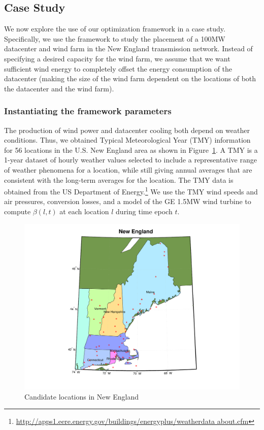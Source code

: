\subsection{Case Study}
\label{sec:eval}

We now explore the use of our optimization framework in a case
study.  Specifically, we use the framework to study the placement of a 100MW
datacenter and wind farm in the New England transmission network.
Instead of specifying a desired capacity for the wind farm, we assume
that we want sufficient wind energy to completely offset the energy
consumption of the datacenter (making the size of the wind farm
dependent on the locations of both the datacenter and the wind farm).

\subsubsection{Instantiating the framework parameters}

The production of wind power and datacenter cooling both depend on
weather conditions.  Thus, we obtained Typical Meteorological Year
(TMY) information for 56 locations in the U.S. New England area as
shown in Figure~\ref{fig:NE_locs}.  A TMY is a 1-year dataset of
hourly weather values selected to include a representative range of
weather phenomena for a location, while still giving annual averages
that are consistent with the long-term averages for the location.  The
TMY data is obtained from the US Department of
Energy.\footnote{\url{http://apps1.eere.energy.gov/buildings/energyplus/weatherdata
    about.cfm}} We use the TMY wind speeds and air pressures,
conversion losses, and a model of the GE 1.5MW wind
turbine \cite{lei2006modeling} to compute
$\beta(l,t)$ at each location $l$ during time epoch $t$. 

\begin{figure}[ht]
\centering
\includegraphics[width=0.8\columnwidth]{img/NE_map}
\caption{Candidate locations in New England}
\label{fig:NE_locs}
\end{figure}


